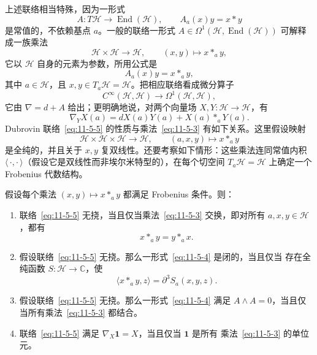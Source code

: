 上述联络相当特殊，因为一形式
\[
  A:T\mathcal H\longrightarrow\operatorname{End}(\mathcal H),
  \qquad A_a(x)y=x*y
\]
是常值的，不依赖基点 $a$。一般的联络一形式
$A\in\Omega^1(\mathcal H,\operatorname{End}(\mathcal H))$ 可解释成一族乘法
\begin{equation}\label{eq:11-5-3}
  \mathcal H\times\mathcal H\longrightarrow\mathcal H,
  \qquad (x,y)\longmapsto x*_a y,
\end{equation}
它以 $\mathcal H$ 自身的元素为参数，所用公式是
\begin{equation}\label{eq:11-5-4}
  A_a(x)y=x*_a y,
\end{equation}
其中 $a\in\mathcal H$，且 $x,y\in T_a\mathcal H=\mathcal H$。把相应联络看成微分算子
\[
  C^\infty(\mathcal H,\mathcal H)
  \longrightarrow\Omega^1(\mathcal H,\mathcal H),
\]
它由 $\nabla=d+A$ 给出；更明确地说，对两个向量场
$X,Y:\mathcal H\to\mathcal H$，有
\begin{equation}\label{eq:11-5-5}
  \nabla_YX(a)=dX(a)Y(a)+X(a)*_aY(a).
\end{equation}
Dubrovin 联络~\eqref{eq:11-5-5} 的性质与乘法~\eqref{eq:11-5-3} 有如下关系。这里假设映射
\[
  \mathcal H\times\mathcal H\times\mathcal H\longrightarrow\mathcal H,
  \qquad (a,x,y)\longmapsto x*_a y
\]
是全纯的，并且关于 $x,y$ 复双线性。还要考察如下情形：这些乘法连同常值内积
$\langle\,\cdot,\cdot\,\rangle$（假设它是双线性而非埃尔米特型的），在每个切空间
$T_a\mathcal H=\mathcal H$ 上确定一个 Frobenius 代数结构。

\begin{lemma}\label{lem:11-5-4}
假设每个乘法 $(x,y)\mapsto x*_a y$ 都满足 Frobenius 条件。则：
\begin{enumerate}[label=(\roman*)]
\item 联络~\eqref{eq:11-5-5} 无挠，当且仅当乘法~\eqref{eq:11-5-3} 交换，即对所有
$a,x,y\in\mathcal H$，都有
\[
  x*_a y=y*_a x.
\]

\item 假设联络~\eqref{eq:11-5-5} 无挠。那么一形式~\eqref{eq:11-5-4} 是闭的，当且仅当
存在全纯函数 $S:\mathcal H\to\mathbb C$，使
\begin{equation}\label{eq:11-5-6}
  \langle x*_a y,z\rangle=\partial^3S_a(x,y,z).
\end{equation}

\item 假设联络~\eqref{eq:11-5-5} 无挠。那么一形式~\eqref{eq:11-5-4} 满足
$A\wedge A=0$，当且仅当所有乘法~\eqref{eq:11-5-3} 都结合。

\item 联络~\eqref{eq:11-5-5} 满足 $\nabla_X\mathbf 1=X$，当且仅当 $\mathbf 1$ 是所有
乘法~\eqref{eq:11-5-3} 的单位元。
\end{enumerate}
\end{lemma}

